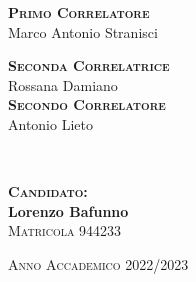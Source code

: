 \begin{titlepage}
\begin{minipage}[t]{0.47\textwidth}
        {\large{\bf \textsc{Primo Correlatore}}\\
        Marco Antonio Stranisci\\
        }
        
        {\large{\bf \textsc{Seconda Correlatrice}}\\
        	Rossana Damiano}\\
        
        {\large{\bf \textsc{Secondo Correlatore}}\\
        	Antonio Lieto
        }
    \end{minipage}
    \\
    \null\hfill
    \begin{minipage}[t]{0.40\textwidth}
        \vspace{10mm}
        {\large{\bf \textsc{Candidato:}\\
                Lorenzo Bafunno\\
            } \large{\textsc{Matricola} 944233}}
    \end{minipage}
    \vspace{10mm}
    \begin{center}
        {\large{\textsc{Anno Accademico 2022/2023}}}
    \end{center}
\end{titlepage}
